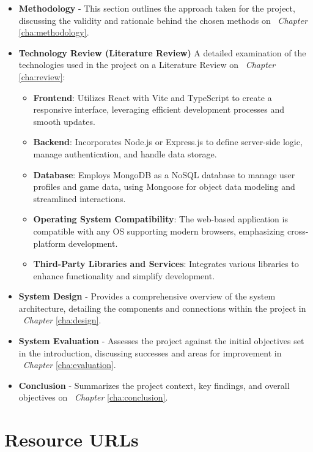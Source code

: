 \begin{itemize}
    \item \textbf{Methodology}
    - This section outlines the approach taken for the project, discussing the validity and rationale behind the chosen methods on ~\textit{Chapter} \ref{cha:methodology}.
    \item \textbf{Technology Review (Literature Review)}
    A detailed examination of the technologies used in the project on a Literature Review on ~\textit{Chapter} \ref{cha:review}:
    \begin{itemize}
        \item \textbf{Frontend}: Utilizes React with Vite and TypeScript to create a responsive interface, leveraging efficient development processes and smooth updates.
        \item \textbf{Backend}: Incorporates Node.js or Express.js to define server-side logic, manage authentication, and handle data storage.
        \item \textbf{Database}: Employs MongoDB as a NoSQL database to manage user profiles and game data, using Mongoose for object data modeling and streamlined interactions.
        \item \textbf{Operating System Compatibility}: The web-based application is compatible with any OS supporting modern browsers, emphasizing cross-platform development.
        \item \textbf{Third-Party Libraries and Services}: Integrates various libraries to enhance functionality and simplify development. 
    \end{itemize}
    \item \textbf{System Design}
    - Provides a comprehensive overview of the system architecture, detailing the components and connections within the project in ~\textit{Chapter} \ref{cha:design}.
    \item \textbf{System Evaluation}
    - Assesses the project against the initial objectives set in the introduction, discussing successes and areas for improvement in ~\textit{Chapter} \ref{cha:evaluation}.
    \item \textbf{Conclusion}
    - Summarizes the project context, key findings, and overall objectives on ~\textit{Chapter} \ref{cha:conclusion}.
\end{itemize}

\section*{Resource URLs}

